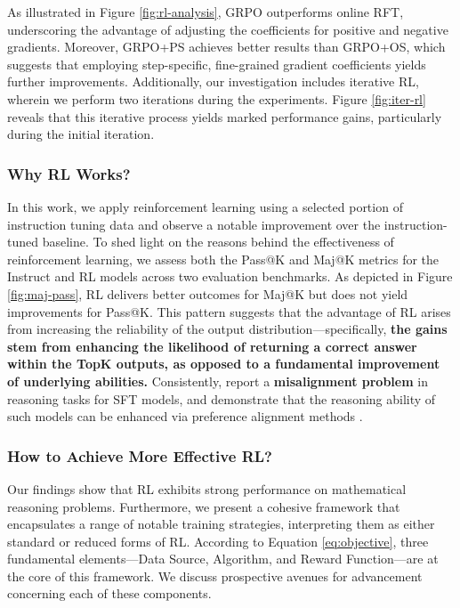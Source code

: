 As illustrated in Figure \ref{fig:rl-analysis}, GRPO outperforms online RFT, underscoring the advantage of adjusting the coefficients for positive and negative gradients. Moreover, GRPO+PS achieves better results than GRPO+OS, which suggests that employing step-specific, fine-grained gradient coefficients yields further improvements. Additionally, our investigation includes iterative RL, wherein we perform two iterations during the experiments. Figure \ref{fig:iter-rl} reveals that this iterative process yields marked performance gains, particularly during the initial iteration.

\subsubsection{Why RL Works?} In this work, we apply reinforcement learning using a selected portion of instruction tuning data and observe a notable improvement over the instruction-tuned baseline. To shed light on the reasons behind the effectiveness of reinforcement learning, we assess both the Pass@K and Maj@K metrics for the Instruct and RL models across two evaluation benchmarks. As depicted in Figure \ref{fig:maj-pass}, RL delivers better outcomes for Maj@K but does not yield improvements for Pass@K. This pattern suggests that the advantage of RL arises from increasing the reliability of the output distribution—specifically, \textbf{the gains stem from enhancing the likelihood of returning a correct answer within the TopK outputs, as opposed to a fundamental improvement of underlying abilities.} Consistently, \citep{wang2023making} report a \textbf{misalignment problem} in reasoning tasks for SFT models, and demonstrate that the reasoning ability of such models can be enhanced via preference alignment methods \citep{yuan2023rrhf,song2023preference,wang2023making}.

\subsubsection{How to Achieve More Effective RL?}
\label{sec:effec_rl}
Our findings show that RL exhibits strong performance on mathematical reasoning problems. Furthermore, we present a cohesive framework that encapsulates a range of notable training strategies, interpreting them as either standard or reduced forms of RL. According to Equation \ref{eq:objective}, three fundamental elements—Data Source, Algorithm, and Reward Function—are at the core of this framework. We discuss prospective avenues for advancement concerning each of these components.

